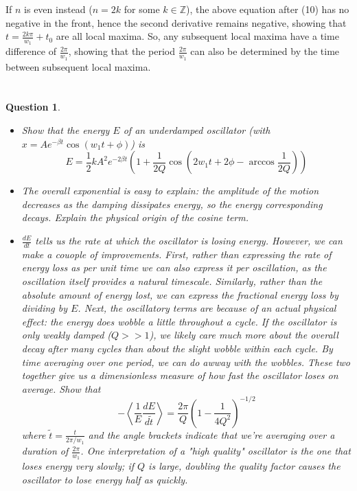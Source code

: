 \documentclass{article}
\newtheorem{question}{Question}
\newcommand{\ZZ}{\mathbb{Z}}
\begin{document}
If $n$ is even instead ($n=2k$ for some $k\in\ZZ$), the above equation after (10) has no negative in the front, hence the second derivative remains negative, showing that $t=\frac{2k \pi}{w_1}+t_0$ are all local maxima.
So, any subsequent local maxima have a time difference of $\frac{2\pi}{w_1}$, showing that the period $\frac{2\pi}{w_1}$ can also be determined by the time between subsequent local maxima.

\break

\section{}
\begin{question}\label{q2}
    
    \hfil

    \begin{itemize}
        \item[(a)] Show that the energy $E$ of an underdamped oscillator (with $x=Ae^{-\beta t}\cos(w_1 t+\phi)$) is 
        $$E=\frac{1}{2}kA^2e^{-2\beta t}\left(1+\frac{1}{2Q}\cos\left(2w_1 t+2\phi-\arccos\frac{1}{2Q}\right)\right)$$
        \item[(b)] The overall exponential is easy to explain: the amplitude of the motion decreases as the damping dissipates energy, so the energy corresponding decays. Explain the physical origin of the cosine term.
        \item[(c)] $\frac{dE}{dt}$ tells us the rate at which the oscillator is losing energy. However, we can make a couople of improvements. First, rather than expressing the rate of energy loss as \emph{per unit time} we can also express it \emph{per oscillation}, as the oscillation itself provides a natural timescale. Similarly, rather than the absolute amount of energy lost, we can express the fractional energy loss by dividing by $E$.
        Next, the oscillatory terms are because of an actual physical effect: the energy does wobble a little throughout a cycle. If the oscillator is only weakly damped ($Q>>1$), we likely care much more about the overall decay after many cycles than about the slight wobble within each cycle. By time averaging over one period, we can do awway with the wobbles. These two together give us a dimensionless measure of how fast the oscillator loses on average. Show that
        $$-\left<\frac{1}{E}\frac{dE}{d\tilde{t}}\right>=\frac{2\pi}{Q}\left(1-\frac{1}{4Q^2}\right)^{-1/2}$$
        where $\tilde{t}=\frac{t}{2\pi/w_1}$ and the angle brackets indicate that we're averaging over a duration of $\frac{2\pi}{w_1}$. One interpretation of a "high quality" oscillator is the one that loses energy very slowly; if $Q$ is large, doubling the quality factor causes the oscillator to lose energy half as quickly.
    \end{itemize}
\end{question}
\end{document}
